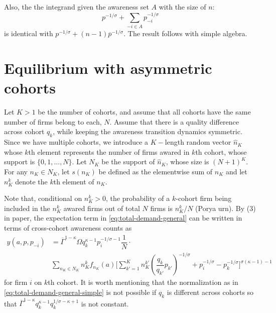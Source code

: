 \documentclass[12pt]{article}
\theoremstyle{definition}
\begin{document}
Also, the the integrand given the awareness set $A$ with the size of $n$: 
$$
p^{-1/\sigma} + \sum_{-i \in A} p_{-i}^{-1/\sigma}
$$
is identical with $p ^{-1/\sigma} + (n-1) \overline{p}^{-1/\sigma}$. The result follows with simple algebra.


\section{Equilibrium with asymmetric cohorts}
Let $K > 1$ be the number of cohorts, and assume that all cohorts have the same number of firms belong to each, $N$. Assume that there is a quality difference across cohort $q_{k}$, while keeping the awareness transition dynamics symmetric.  Since we have multiple cohorts, we introduce a $K-$length random vector $\widehat n_K$ whose $k$th element represents the number of firms awared in $k$th cohort, whose support is $\{0, 1,..., N\}$. Let $N_K$ be the support of $\widehat  n_K$, whose size is $(N+1)^K$.  For any $n_K \in N_K$, let $s(n_K)$ be defined as the elementwise sum of $n_K$ and let $n_K^k$ denote the $k$th element of $n_K$.

Note that, conditional on $n^k_K > 0$, the probability of a $k$-cohort firm being included in the $n^k_K$ awared firms out of total $N$ firms is $n^k_K/N$ (Porya urn). By (3) in paper, the expectation term in \autoref{eq:total-demand-general} can be written in terms of cross-cohort awareness counts as
\begin{equation}
\begin{aligned}
y(a, p, p_{-i}) &=  \overline{\Gamma}^{1 - \kappa} \Omega q_k^{\kappa-1} p_i^{-1/\sigma-1} \dfrac{1}{N} \cdot \\ 
&\sum_{ n_K \in N_K } n^k_K f_{n_K}(a) \Bigg[ \sum_{k' =1 }^K n_K^{k'} \left( \dfrac{q_k}{q_{k'}} p_{k'} \right)^{-1/\sigma} +   
 p_i^{-1/\sigma}   - p^{-1/\sigma}_{k}  \Bigg]^{\sigma(\kappa-1) -1} 
\end{aligned}
\end{equation}
for firm $i$ on $k$th cohort. It is worth mentioning that the normalization as in \autoref{eq:total-demand-general-simple} is not possible if $q_k$ is different across cohorts so that $\overline{\Gamma}^{1-\kappa}  q_k^{\kappa-1} q_k^{1/\sigma - \kappa + 1 }$ is not constant.
\end{document}

